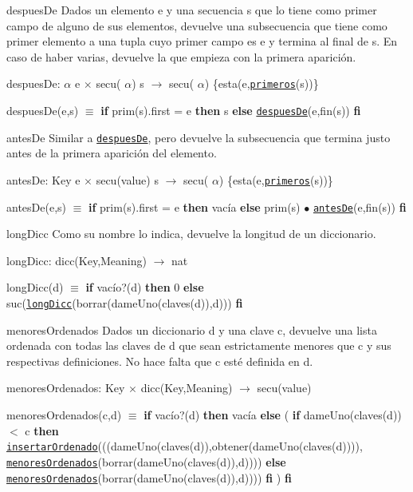\begin{DoxyParagraph}{despues\-De}
Dados un elemento e y una secuencia s que lo tiene como primer campo de alguno de sus elementos, devuelve una subsecuencia que tiene como primer elemento a una tupla cuyo primer campo es e y termina al final de s. En caso de haber varias, devuelve la que empieza con la primera aparición.

despues\-De\-:  $\alpha$ e $\times$ secu( $\alpha$) s $\to$ secu( $\alpha$) \{esta(e,\href{axiomas.html#primeros}{\tt primeros}(s))\} \par
despues\-De(e,s) $\equiv$ {\bfseries if} prim(s).first = e {\bfseries then} s {\bfseries else} \href{axiomas.html#despuesDe}{\tt despues\-De}(e,fin(s)) {\bfseries fi} 


\end{DoxyParagraph}
\begin{DoxyParagraph}{antes\-De}
Similar a \href{axiomas.html#despuesDe}{\tt despues\-De}, pero devuelve la subsecuencia que termina justo antes de la primera aparición del elemento.

antes\-De\-: Key e $\times$ secu(value) s $\to$ secu( $\alpha$) \{esta(e,\href{axiomas.html#primeros}{\tt primeros}(s))\} \par
antes\-De(e,s) $\equiv$ {\bfseries if} prim(s).first = e {\bfseries then} vacía {\bfseries else} prim(s) $\bullet$ \href{axiomas.html#antesDe}{\tt antes\-De}(e,fin(s)) {\bfseries fi} 


\end{DoxyParagraph}
\begin{DoxyParagraph}{long\-Dicc}
Como su nombre lo indica, devuelve la longitud de un diccionario.

long\-Dicc\-: dicc(\-Key,\-Meaning) $\to$ nat \par
long\-Dicc(d) $\equiv$ {\bfseries if} vacío?(d) {\bfseries then} 0 {\bfseries else} suc(\href{axiomas.html#longDicc}{\tt long\-Dicc}(borrar(dame\-Uno(claves(d)),d))) {\bfseries fi} 


\end{DoxyParagraph}
\begin{DoxyParagraph}{menores\-Ordenados}
Dados un diccionario d y una clave c, devuelve una lista ordenada con todas las claves de d que sean estrictamente menores que c y sus respectivas definiciones. No hace falta que c esté definida en d.

menores\-Ordenados\-: Key $\times$ dicc(\-Key,\-Meaning) $\to$ secu(value) \par
menores\-Ordenados(c,d) $\equiv$ {\bfseries if} vacío?(d) {\bfseries then} vacía {\bfseries else} ( {\bfseries if} dame\-Uno(claves(d)) $<$ c {\bfseries then} \href{axiomas.html#insertarOrdenado}{\tt insertar\-Ordenado}(((dame\-Uno(claves(d)),obtener(dame\-Uno(claves(d)))), \href{axiomas.html#menoresOrdenados}{\tt menores\-Ordenados}(borrar(dame\-Uno(claves(d)),d)))) {\bfseries else} \href{axiomas.html#menoresOrdenados}{\tt menores\-Ordenados}(borrar(dame\-Uno(claves(d)),d)))) {\bfseries fi} ) {\bfseries fi} 


\end{DoxyParagraph}
